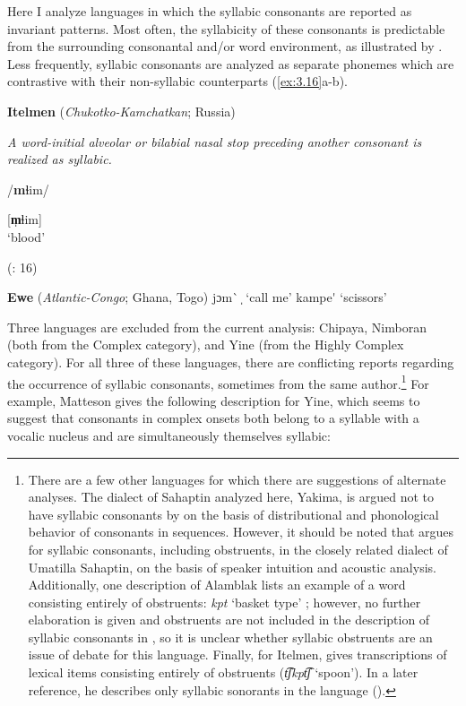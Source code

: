   Here I analyze languages in which the syllabic consonants are reported as invariant patterns. Most often, the syllabicity of these consonants is predictable from the surrounding consonantal and/or word environment, as illustrated by . Less frequently, syllabic consonants are analyzed as separate phonemes which are contrastive with their non-syllabic counterparts (\ref{ex:3.16}a-b).

\ea\label{ex:3.15}
  \textbf{Itelmen} (\textit{Chukotko-Kamchatkan}; Russia)

\textit{A word-initial alveolar or bilabial nasal stop preceding another consonant is realized as syllabic.}

/\textbf{m}ɬim/

[\textbf{m̩}ɬim]\\
\glt ‘blood’

(\citealt{GeorgVolodin1999}: 16)
\z

\ea\label{ex:3.16}
  \textbf{Ewe} (\textit{Atlantic-Congo}; Ghana, Togo)
\ea   jɔm\`{} ̩
\glt  ‘call me’
\ex kampe\'{} 
\glt  ‘scissors’
\citep[38]{Ameka1991}
\z
\z

  Three languages are excluded from the current analysis: Chipaya, Nimboran (both from the Complex category), and Yine (from the Highly Complex category). For all three of these languages, there are conflicting reports regarding the occurrence of syllabic consonants, sometimes from the same author.\footnote{{There are a few other languages for which there are suggestions of alternate analyses. The dialect of Sahaptin analyzed here, Yakima, is argued not to have syllabic consonants by \citet{HargusBeavert2006} on the basis of distributional and phonological behavior of consonants in sequences. However, it should be noted that \citet{Minthorn2005} argues for syllabic consonants, including obstruents, in the closely related dialect of Umatilla Sahaptin, on the basis of speaker intuition and acoustic analysis. Additionally, one description of Alamblak lists an example of a word consisting entirely of obstruents:} \textrm{\textit{kpt}} \textrm{‘basket type’ \citet[1]{SIL2004}; however, no further elaboration is given and obstruents are not included in the description of syllabic consonants in \citet{Bruce1984}, so it is unclear whether syllabic obstruents are an issue of debate for this language. Finally, for Itelmen, \citet[42]{Volodin1976} gives transcriptions of lexical items consisting entirely of obstruents (}\textrm{\textit{t͡ʃkpt͡ʃ} }\textrm{‘spoon’). In a later reference, he describes only syllabic sonorants in the language (\citealt{GeorgVolodin1999}).}} For example, Matteson gives the following description for Yine, which seems to suggest that consonants in complex onsets both belong to a syllable with a vocalic nucleus and are simultaneously themselves syllabic:

